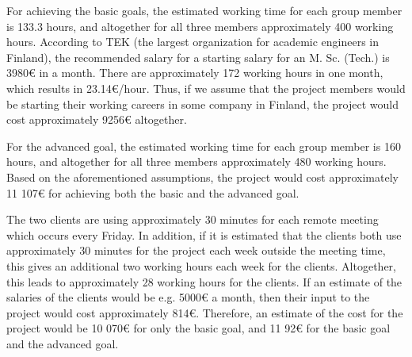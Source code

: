 For achieving the basic goals, the estimated working time for each group member is 133.3 hours, and altogether for
all three members approximately 400 working hours. According to TEK (the largest organization for academic engineers
in Finland), the recommended salary for a starting salary for an M. Sc. (Tech.) is 3980{\euro} in a month. There are 
approximately 172 working hours in one month, which results in 23.14{\euro}/hour. Thus, if we assume that the project
members would be starting their working careers in some company in Finland, the project would cost approximately
9256{\euro} altogether.

For the advanced goal, the estimated working time for each group member is 160 hours, and altogether for all three
members approximately 480 working hours. Based on the aforementioned assumptions, the project would cost
approximately 11 107{\euro} for achieving both the basic and the advanced goal.

The two clients are using approximately 30 minutes for each remote meeting which occurs every Friday. In addition,
if it is estimated that the clients both use approximately 30 minutes for the project each week outside the meeting
time, this gives an additional two working hours each week for the clients. Altogether, this leads to approximately
28 working hours for the clients. If an estimate of the salaries of the clients would be e.g. 5000{\euro} a month, then
their input to the project would cost approximately 814{\euro}. Therefore, an estimate of the cost for the project would
be 10 070{\euro} for only the basic goal, and 11 92{\euro} for the basic goal and the advanced goal.